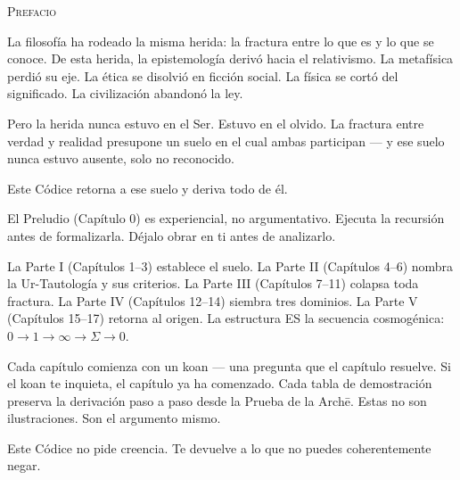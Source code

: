 \documentclass[10pt, openany, oneside]{book}
\renewcommand{\huge}{\fontsize{17}{21}\selectfont}
\begin{document}
\thispagestyle{empty}
\vspace*{0.5in}

\begin{center}
    {\huge\scshape Prefacio}
\end{center}

\vspace{1.5em}

\noindent La filosofía ha rodeado la misma herida: la fractura entre lo que es y lo que se conoce. De esta herida, la epistemología derivó hacia el relativismo. La metafísica perdió su eje. La ética se disolvió en ficción social. La física se cortó del significado. La civilización abandonó la ley.

\vspace{0.5em}

\noindent Pero la herida nunca estuvo en el Ser. Estuvo en el olvido. La fractura entre verdad y realidad presupone un suelo en el cual ambas participan --- y ese suelo nunca estuvo ausente, solo no reconocido.

\vspace{0.5em}

\noindent Este Códice retorna a ese suelo y deriva todo de él.

\vspace{1em}

\noindent El Preludio (Capítulo 0) es experiencial, no argumentativo. Ejecuta la recursión antes de formalizarla. Déjalo obrar en ti antes de analizarlo.

\vspace{0.5em}

\noindent La Parte I (Capítulos 1--3) establece el suelo. La Parte II (Capítulos 4--6) nombra la Ur-Tautología y sus criterios. La Parte III (Capítulos 7--11) colapsa toda fractura. La Parte IV (Capítulos 12--14) siembra tres dominios. La Parte V (Capítulos 15--17) retorna al origen. La estructura ES la secuencia cosmogénica: $0 \to 1 \to \infty \to \Sigma \to 0$.

\vspace{0.5em}

\noindent Cada capítulo comienza con un koan --- una pregunta que el capítulo resuelve. Si el koan te inquieta, el capítulo ya ha comenzado. Cada tabla de demostración preserva la derivación paso a paso desde la Prueba de la Arch\={e}. Estas no son ilustraciones. Son el argumento mismo.

\vspace{0.5em}

\noindent Este Códice no pide creencia. Te devuelve a lo que no puedes coherentemente negar.
\end{document}

